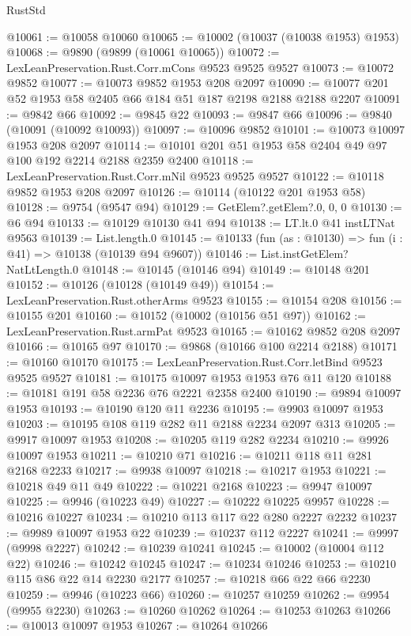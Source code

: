 \begin{lexlean}{RustStd}
\begin{coremodule}
@10061 := @10058 @10060
@10065 := @10002 (@10037 (@10038 @1953) @1953)
@10068 := @9890 (@9899 (@10061 @10065))
@10072 := LexLeanPreservation.Rust.Corr.mCons @9523 @9525 @9527
@10073 := @10072 @9852
@10077 := @10073 @9852 @1953 @208 @2097
@10090 := @10077 @201 @52 @1953 @58 @2405 @66 @184 @51 @187 @2198 @2188 @2188 @2207
@10091 := @9842 @66
@10092 := @9845 @22
@10093 := @9847 @66
@10096 := @9840 (@10091 (@10092 @10093))
@10097 := @10096 @9852
@10101 := @10073 @10097 @1953 @208 @2097
@10114 := @10101 @201 @51 @1953 @58 @2404 @49 @97 @100 @192 @2214 @2188 @2359 @2400
@10118 := LexLeanPreservation.Rust.Corr.mNil @9523 @9525 @9527
@10122 := @10118 @9852 @1953 @208 @2097
@10126 := @10114 (@10122 @201 @1953 @58)
@10128 := @9754 (@9547 @94)
@10129 := GetElem?.getElem?.{0, 0, 0}
@10130 := @6 @94
@10133 := @10129 @10130 @41 @94
@10138 := LT.lt.{0} @41 instLTNat @9563
@10139 := List.length.{0}
@10145 := @10133 (fun (as : @10130) => fun (i : @41) => @10138 (@10139 @94 @9607))
@10146 := List.instGetElem?NatLtLength.{0}
@10148 := @10145 (@10146 @94)
@10149 := @10148 @201
@10152 := @10126 (@10128 (@10149 @49))
@10154 := LexLeanPreservation.Rust.otherArms @9523
@10155 := @10154 @208
@10156 := @10155 @201
@10160 := @10152 (@10002 (@10156 @51 @97))
@10162 := LexLeanPreservation.Rust.armPat @9523
@10165 := @10162 @9852 @208 @2097
@10166 := @10165 @97
@10170 := @9868 (@10166 @100 @2214 @2188)
@10171 := @10160 @10170
@10175 := LexLeanPreservation.Rust.Corr.letBind @9523 @9525 @9527
@10181 := @10175 @10097 @1953 @1953 @76 @11 @120
@10188 := @10181 @191 @58 @2236 @76 @2221 @2358 @2400
@10190 := @9894 @10097 @1953
@10193 := @10190 @120 @11 @2236
@10195 := @9903 @10097 @1953
@10203 := @10195 @108 @119 @282 @11 @2188 @2234 @2097 @313
@10205 := @9917 @10097 @1953
@10208 := @10205 @119 @282 @2234
@10210 := @9926 @10097 @1953
@10211 := @10210 @71
@10216 := @10211 @118 @11 @281 @2168 @2233
@10217 := @9938 @10097
@10218 := @10217 @1953
@10221 := @10218 @49 @11 @49
@10222 := @10221 @2168
@10223 := @9947 @10097
@10225 := @9946 (@10223 @49)
@10227 := @10222 @10225 @9957
@10228 := @10216 @10227
@10234 := @10210 @113 @117 @22 @280 @2227 @2232
@10237 := @9989 @10097 @1953 @22
@10239 := @10237 @112 @2227
@10241 := @9997 (@9998 @2227)
@10242 := @10239 @10241
@10245 := @10002 (@10004 @112 @22)
@10246 := @10242 @10245
@10247 := @10234 @10246
@10253 := @10210 @115 @86 @22 @14 @2230 @2177
@10257 := @10218 @66 @22 @66 @2230
@10259 := @9946 (@10223 @66)
@10260 := @10257 @10259
@10262 := @9954 (@9955 @2230)
@10263 := @10260 @10262
@10264 := @10253 @10263
@10266 := @10013 @10097 @1953
@10267 := @10264 @10266

\end{coremodule}
\end{lexlean}
